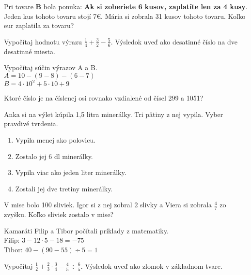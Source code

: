 \begin{example}
	Pri tovare \textbf{B} bola ponuka: \textbf{Ak si zoberiete 6 kusov, zaplatíte len za 4 kusy}. Jeden kus tohoto tovaru stojí 7€. Mária si zobrala 31 kusov tohoto tovaru. Koľko eur zaplatila za tovaru?
\end{example}

\begin{example}
	Vypočítaj hodnotu výrazu $\frac{1}{4} + \frac{3}{2} - \frac{5}{6}$. Výsledok uveď ako desatinné číslo na dve desatinné miesta.
\end{example}

\begin{example}
	Vypočítaj súčin výrazov A a B. \\
	$A = 10 - (9 - 8) - (6 - 7)$\\
	$B = 4 \cdot 10^2 + 5 \cdot 10 + 9$
\end{example}

\begin{example}
	Ktoré číslo je na číslenej osi rovnako vzdialené od čísel 299 a 1051?
\end{example}

\begin{example}
	Anka si na výlet kúpila 1,5 litra minerálky. Tri pätiny z nej vypila. Vyber pravdivé tvrdenia. \\
	\begin{enumerate}
		\item Vypila menej ako polovicu.
		\item Zostalo jej 6 dl minerálky.
		\item Vypila viac ako jeden liter minerálky.
		\item Zostali jej dve tretiny minerálky.
	\end{enumerate}
\end{example}

\begin{example}
	V mise bolo 100 sliviek. Igor si z nej zobral 2 slivky a Viera si zobrala $\frac{4}{7}$ zo zvyšku. Koľko sliviek zostalo v mise?
\end{example}

\begin{example}
	Kamaráti Filip a Tibor počítali príklady z matematiky. \\
	Filip: $3 - 12 \cdot 5 -18 = -75$\\
	Tibor: $40 - (90 - 	55) \div 5 = 1$
\end{example}

\begin{example}
	Vypočítaj $\frac{1}{2} + \frac{2}{3} \cdot \frac{3}{4} - \frac{4}{5} \div \frac{6}{5}$. Výsledok uveď ako zlomok v základnom tvare.
\end{example}

